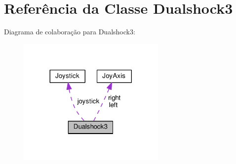 \hypertarget{classDualshock3}{}\section{Referência da Classe Dualshock3}
\label{classDualshock3}


Diagrama de colaboração para Dualshock3\+:\nopagebreak
\begin{figure}[H]
\begin{center}
\leavevmode
\includegraphics[width=204pt]{classDualshock3__coll__graph}
\end{center}
\end{figure}

